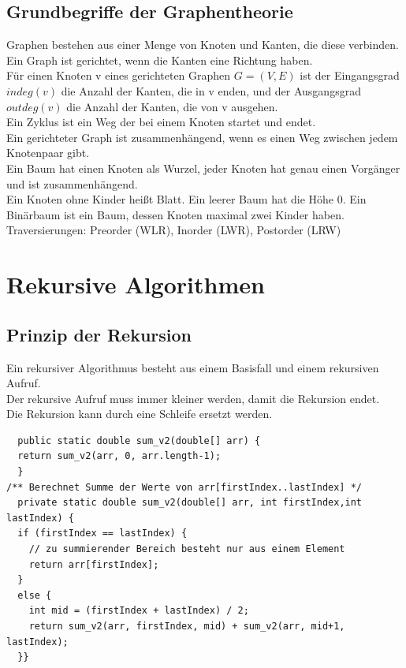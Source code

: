 \documentclass{scrreprt}
\begin{document}
\section{Grundbegriffe der Graphentheorie}
Graphen bestehen aus einer Menge von Knoten und Kanten, die diese verbinden.
\\Ein Graph ist gerichtet, wenn die Kanten eine Richtung haben.
\\Für einen Knoten v eines gerichteten Graphen $G=(V,E)$ ist der Eingangsgrad $indeg(v)$ die Anzahl der Kanten,
die in v enden, und der Ausgangsgrad $outdeg(v)$ die Anzahl der Kanten, die von v ausgehen.
\\Ein Zyklus ist ein Weg der bei einem Knoten startet und endet.
\\Ein gerichteter Graph ist zusammenhängend, wenn es einen Weg zwischen jedem Knotenpaar gibt.
\\Ein Baum hat einen Knoten als Wurzel, jeder Knoten hat genau einen Vorgänger und ist zusammenhängend.
\\Ein Knoten ohne Kinder heißt Blatt. Ein leerer Baum hat die Höhe 0.
Ein Binärbaum ist ein Baum, dessen Knoten maximal zwei Kinder haben.
\\Traversierungen: Preorder (WLR), Inorder (LWR), Postorder (LRW)
\chapter{Rekursive Algorithmen}
\section{Prinzip der Rekursion}
Ein rekursiver Algorithmus besteht aus einem Basisfall und einem rekursiven Aufruf.
\\Der rekursive Aufruf muss immer kleiner werden, damit die Rekursion endet.
\\Die Rekursion kann durch eine Schleife ersetzt werden.
\begin{lstlisting}
  public static double sum_v2(double[] arr) {
  return sum_v2(arr, 0, arr.length-1);
  }
/** Berechnet Summe der Werte von arr[firstIndex..lastIndex] */
  private static double sum_v2(double[] arr, int firstIndex,int lastIndex) {
  if (firstIndex == lastIndex) {
    // zu summierender Bereich besteht nur aus einem Element
    return arr[firstIndex];
  }
  else {
    int mid = (firstIndex + lastIndex) / 2;
    return sum_v2(arr, firstIndex, mid) + sum_v2(arr, mid+1, lastIndex);
  }}
  \end{lstlisting}
\end{document}
